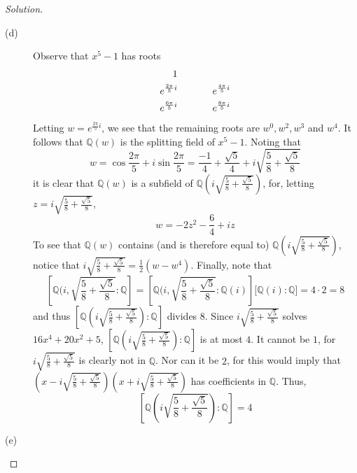 \documentclass[12pt,leqno]{article}
\numberwithin{equation}{section}
\theoremstyle{definition}
\begin{document}
\begin{proof}[Solution]
\begin{description}
  \item [(d)] Observe that $x^5-1$ has roots {\Large\begin{align*}1&\hskip.5in\\e^{\frac{2\pi}{5}i}&\hskip.5in e^{\frac{4\pi}{5}i}\\e^{\frac{6\pi}{5}i}&\hskip.5in e^{\frac{8\pi}{5}i}\end{align*}} Letting $w=e^{\frac{2\pi}{5}i}$, we see that the remaining roots are $w^0,w^2,w^3$ and $w^4$. It follows that $\mathbb{Q}(w)$ is the splitting field of $x^5-1$. Noting that \[w=\cos\frac{2\pi}{5}+i\sin\frac{2\pi}{5}=\frac{-1}{4}+\frac{\sqrt{5}}{4}+i\sqrt{\frac{5}{8}+\frac{\sqrt{5}}{8}}\] it is clear that $\mathbb{Q}(w)$ is a subfield of $\mathbb{Q}\left(i\sqrt{\frac{5}{8}+\frac{\sqrt{5}}{8}}\right)$, for, letting $z=i\sqrt{\frac{5}{8}+\frac{\sqrt{5}}{8}}$, \[w=-2z^2-\frac{6}{4}+iz\] To see that $\mathbb{Q}(w)$ contains (and is therefore equal to) $\mathbb{Q}\left(i\sqrt{\frac{5}{8}+\frac{\sqrt{5}}{8}}\right)$, notice that $i\sqrt{\frac{5}{8}+\frac{\sqrt{5}}{8}}=\frac{1}{2}\left(w-w^4\right)$. Finally, note that \[\left[\mathbb{Q}(i,\sqrt{\frac{5}{8}+\frac{\sqrt{5}}{8}}:\mathbb{Q}\right]=\left[\mathbb{Q}(i,\sqrt{\frac{5}{8}+\frac{\sqrt{5}}{8}}:\mathbb{Q}(i)\right]\Bigg[\mathbb{Q}(i):\mathbb{Q}\Bigg]=4\cdot2=8\] and thus $\left[\mathbb{Q}\left(i\sqrt{\frac{5}{8}+\frac{\sqrt{5}}{8}}\right):\mathbb{Q}\right]$ divides $8$. Since $i\sqrt{\frac{5}{8}+\frac{\sqrt{5}}{8}}$ solves $16x^4+20x^2+5$, $\left[\mathbb{Q}\left(i\sqrt{\frac{5}{8}+\frac{\sqrt{5}}{8}}\right):\mathbb{Q}\right]$ is at most $4$. It cannot be $1$, for $i\sqrt{\frac{5}{8}+\frac{\sqrt{5}}{8}}$ is clearly not in $\mathbb{Q}$. Nor can it be $2$, for this would imply that $\left(x-i\sqrt{\frac{5}{8}+\frac{\sqrt{5}}{8}}\right)\left(x+i\sqrt{\frac{5}{8}+\frac{\sqrt{5}}{8}}\right)$ has coefficients in $\mathbb{Q}$. Thus, \[\left[\mathbb{Q}\left(i\sqrt{\frac{5}{8}+\frac{\sqrt{5}}{8}}\right):\mathbb{Q}\right]=4\]
  \item [(e)]
 \end{description}
\end{proof}
\end{document}
